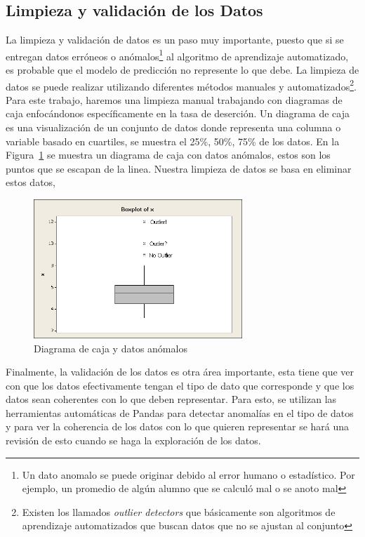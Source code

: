 \subsection{Limpieza y validación de los Datos}
La limpieza y validación de datos es un paso muy importante, puesto que si se entregan datos erróneos o anómalos\footnote{Un dato anomalo se puede originar debido al error humano o estadístico. Por ejemplo, un promedio de algún alumno que se calculó mal o se anoto mal } al algoritmo de aprendizaje automatizado, es probable que el modelo de predicción no represente lo que debe. La limpieza de datos se puede realizar utilizando diferentes métodos manuales y automatizados\footnote{Existen los llamados \textit{outlier detectors} que básicamente son algoritmos de aprendizaje automatizados que buscan datos que no se ajustan al conjunto}. Para este trabajo, haremos una limpieza manual trabajando con diagramas de caja enfocándonos específicamente en la tasa de deserción.
Un diagrama de caja es una visualización de un conjunto de datos donde representa una columna o variable basado en cuartiles, se muestra el 25\%, 50\%, 75\% de los datos.
En la Figura~\ref{fig:outlier} se muestra un diagrama de caja con datos anómalos, estos son los puntos que se escapan de la linea. Nuestra limpieza de datos se basa en eliminar estos datos,
\begin{figure}
  \centering
    \includegraphics[width=0.7\textwidth]{Figuras/outlier1}
      \caption{Diagrama de caja y datos anómalos}
    \label{fig:outlier}
\end{figure}
Finalmente, la validación de los datos es otra área importante, esta tiene que ver con que los datos efectivamente tengan el tipo de dato que corresponde y que los datos sean coherentes con lo que deben representar. Para esto, se utilizan las herramientas automáticas de Pandas para detectar anomalías en el tipo de datos y para ver la coherencia de los datos con lo que quieren representar se hará una revisión de esto cuando se haga la exploración de los datos.
